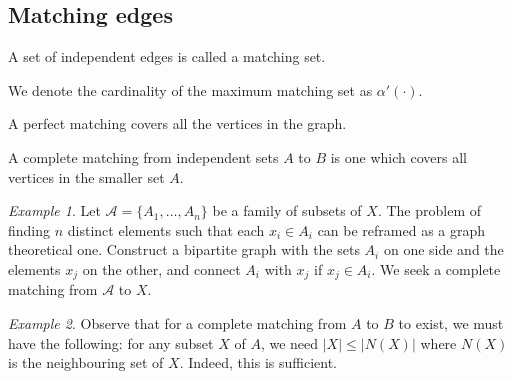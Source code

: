 \documentclass[11pt]{article}
\theoremstyle{definition}
\theoremstyle{remark}
\newtheorem*{example}{Example}
\numberwithin{equation}{section}
\begin{document}
    \subsection{Matching edges}

    \begin{definition}
        A set of independent edges is called a matching set.
    \end{definition}

    \begin{definition}
        We denote the cardinality of the maximum matching set as $\alpha'(\cdot)$.
    \end{definition}

    \begin{definition}
        A perfect matching covers all the vertices in the graph.
    \end{definition}

    \begin{definition}
        A complete matching from independent sets $A$ to $B$ is one which covers all
        vertices in the smaller set $A$.
    \end{definition}

    \begin{example}
        Let $\mathscr{A} = \{A_1, \dots, A_n\}$ be a family of subsets of $X$. The
        problem of finding $n$ distinct elements such that each $x_i \in A_i$ can be
        reframed as a graph theoretical one. Construct a bipartite graph with the
        sets $A_i$ on one side and the elements $x_j$ on the other, and connect $A_i$
        with $x_j$ if $x_j \in A_i$. We seek a complete matching from $\mathscr{A}$
        to $X$.
    \end{example}
    \begin{example}
        Observe that for a complete matching from $A$ to $B$ to exist, we must have
        the following: for any subset $X$ of $A$, we need $|X| \leq |N(X)|$ where
        $N(X)$ is the neighbouring set of $X$. Indeed, this is sufficient.
    \end{example}
\end{document}
